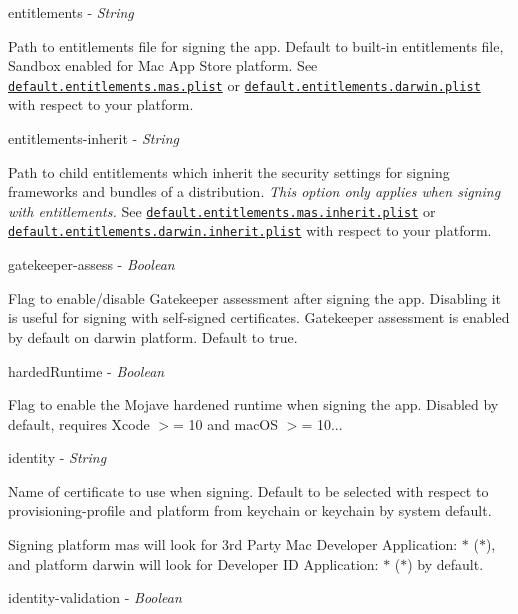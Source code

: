 {\ttfamily entitlements} -\/ {\itshape String}

Path to entitlements file for signing the app. Default to built-\/in entitlements file, Sandbox enabled for Mac App Store platform. See \href{https://github.com/electron-userland/electron-osx-sign/blob/master/default.entitlements.mas.plist}{\tt default.\+entitlements.\+mas.\+plist} or \href{https://github.com/electron-userland/electron-osx-sign/blob/master/default.entitlements.darwin.plist}{\tt default.\+entitlements.\+darwin.\+plist} with respect to your platform.

{\ttfamily entitlements-\/inherit} -\/ {\itshape String}

Path to child entitlements which inherit the security settings for signing frameworks and bundles of a distribution. {\itshape This option only applies when signing with entitlements.} See \href{https://github.com/electron-userland/electron-osx-sign/blob/master/default.entitlements.mas.inherit.plist}{\tt default.\+entitlements.\+mas.\+inherit.\+plist} or \href{https://github.com/electron-userland/electron-osx-sign/blob/master/default.entitlements.darwin.inherit.plist}{\tt default.\+entitlements.\+darwin.\+inherit.\+plist} with respect to your platform.

{\ttfamily gatekeeper-\/assess} -\/ {\itshape Boolean}

Flag to enable/disable Gatekeeper assessment after signing the app. Disabling it is useful for signing with self-\/signed certificates. Gatekeeper assessment is enabled by default on {\ttfamily darwin} platform. Default to {\ttfamily true}.

{\ttfamily harded\+Runtime} -\/ {\itshape Boolean}

Flag to enable the Mojave hardened runtime when signing the app. Disabled by default, requires Xcode $>$= 10 and mac\+OS $>$= 10...

{\ttfamily identity} -\/ {\itshape String}

Name of certificate to use when signing. Default to be selected with respect to {\ttfamily provisioning-\/profile} and {\ttfamily platform} from {\ttfamily keychain} or keychain by system default.

Signing platform {\ttfamily mas} will look for {\ttfamily 3rd Party Mac Developer Application\+: $\ast$ ($\ast$)}, and platform {\ttfamily darwin} will look for {\ttfamily Developer ID Application\+: $\ast$ ($\ast$)} by default.

{\ttfamily identity-\/validation} -\/ {\itshape Boolean}

